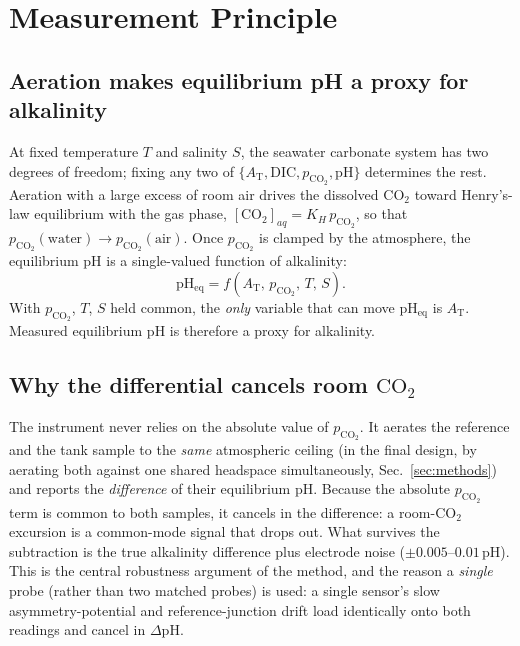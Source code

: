 \documentclass[11pt]{article}
\newcommand{\dpH}{\ensuremath{\Delta\mathrm{pH}}}
\newcommand{\co}{\ensuremath{\mathrm{CO_2}}}
\newcommand{\pco}{\ensuremath{p_{\mathrm{CO_2}}}}
\newcommand{\at}{\ensuremath{A_\mathrm{T}}}
\begin{document}
\section{Measurement Principle}\label{sec:principle}

\subsection{Aeration makes equilibrium pH a proxy for alkalinity}
At fixed temperature $T$ and salinity $S$, the seawater carbonate system has
two degrees of freedom; fixing any two of
$\{\at{}, \mathrm{DIC}, \pco{}, \mathrm{pH}\}$ determines the rest. Aeration with
a large excess of room air drives the dissolved \co{} toward Henry's-law
equilibrium with the gas phase, $[\co{}]_{aq}=K_H\,\pco{}$, so that
$\pco{}(\mathrm{water}) \to \pco{}(\mathrm{air})$. Once \pco{} is clamped by the
atmosphere, the equilibrium pH is a single-valued function of alkalinity:
\begin{equation}
\mathrm{pH_{eq}} = f(\at{},\,\pco{},\,T,\,S).
\label{eq:pheq}
\end{equation}
With \pco{}, $T$, $S$ held common, the \emph{only} variable that can move
$\mathrm{pH_{eq}}$ is \at{}. Measured equilibrium pH is therefore a proxy for
alkalinity.

\subsection{Why the differential cancels room \co{}}
The instrument never relies on the absolute value of \pco{}. It aerates the
reference and the tank sample to the \emph{same} atmospheric ceiling (in the
final design, by aerating both against one shared headspace simultaneously,
Sec.~\ref{sec:methods}) and reports the \emph{difference} of their equilibrium
pH. Because the absolute \pco{} term is common to both samples, it cancels in
the difference: a room-\co{} excursion is a common-mode signal that drops out.
What survives the subtraction is the true alkalinity difference plus electrode
noise ($\pm0.005$--$0.01$\,pH). This is the central robustness argument of the
method, and the reason a \emph{single} probe (rather than two matched probes)
is used: a single sensor's slow asymmetry-potential and reference-junction
drift load identically onto both readings and cancel in \dpH{}.
\end{document}
